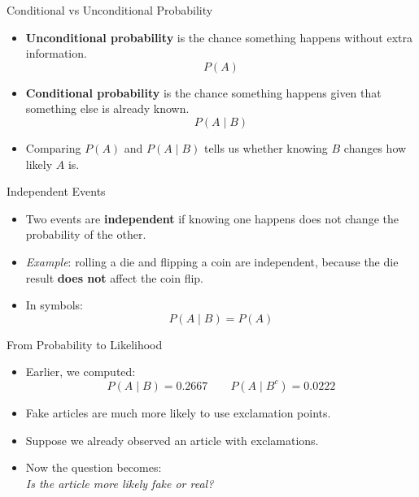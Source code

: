 \documentclass[12pt]{beamer}
\begin{document}
\begin{frame}{}
\begin{block}{Conditional vs Unconditional Probability}
\begin{itemize}
    \item \textbf{Unconditional probability} is the chance something happens without extra information.
    \[
    P(A)
    \]
    \item \textbf{Conditional probability} is the chance something happens given that something else is already known.
    \[
    P(A \mid B)
    \]
    \item Comparing \(P(A)\) and \(P(A \mid B)\) tells us whether knowing \(B\) changes how likely \(A\) is.
\end{itemize}
\end{block}
\end{frame}

\begin{frame}{}
\begin{block}{Independent Events}
\begin{itemize}
    \item Two events are \textbf{independent} if knowing one happens does not change the probability of the other.
    \item \textcolor{aggiemaroon!70}{\emph{Example}: rolling a die and flipping a coin are independent, because the die result \textbf{does not} affect the coin flip.}
    \item In symbols:
    \[
    P(A \mid B) = P(A)
    \]
\end{itemize}
\end{block}
\end{frame}

\begin{frame}{}
\begin{block}{From Probability to Likelihood}
\begin{itemize}
    \item Earlier, we computed:
    \[
    P(A \mid B)=0.2667
    \qquad
    P(A \mid B^c)=0.0222
    \]
    \item Fake articles are much more likely to use exclamation points.
    \item Suppose we already observed an article with exclamations.
    \item[] Now the question becomes:\\
          \centering \textit{Is the article more likely fake or real?}
\end{itemize}
\end{block}
\end{frame}
\end{document}
